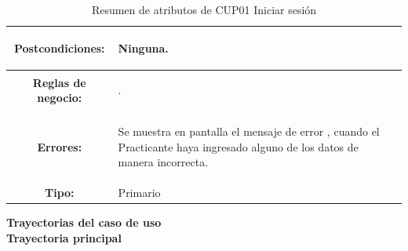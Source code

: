 \begin{table}[H]
\begin{tabular}{| c | p{12 cm} |}
\hline
\textbf{Postcondiciones:} & \vspace{-2mm}	%
							\begin{compactitem}
								\item Ninguna.
							\end{compactitem}\\
\hline
\textbf{Reglas de negocio:} & \vspace{-2mm}	%
							\begin{compactitem}
								\item \nameref{rn:RNR32}.
							\end{compactitem}\\	
\hline
\textbf{Errores:} & \vspace{-2mm}	%
					\begin{compactitem}
						\setlength\itemsep{-0.25em}
						\item Se muestra en pantalla el mensaje de error \nameref{msj:MSG10}, cuando el Practicante haya ingresado alguno de los datos de manera incorrecta.
					\end{compactitem}\\
\hline
\textbf{Tipo:} & Primario\\
\hline	
\end{tabular}
\caption{Resumen de atributos de CUP01 Iniciar sesión}
\label{tab:CUP01}
\end{table} 

\textbf{\textcolor[rgb]{0, 0, 0.545098}{Trayectorias del caso de uso}} \\

\textbf{\large{Trayectoria principal}} \\

